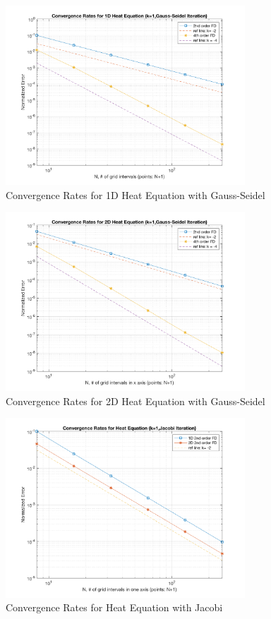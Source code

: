 \documentclass[a4paper]{article}
\begin{document}
\begin{figure}[htbp]
\centering
\includegraphics[width=0.8\textwidth]{gauss_1d.png}
\caption{\label{gauss_1d}Convergence Rates for 1D Heat Equation with Gauss-Seidel}
\end{figure}

\begin{figure}[htbp]
\centering
\includegraphics[width=0.8\textwidth]{gauss_2d.png}
\caption{\label{gauss_2d}Convergence Rates for 2D Heat Equation with Gauss-Seidel}
\end{figure}

\begin{figure}[htbp]
\centering
\includegraphics[width=0.8\textwidth]{jacobi.png}
\caption{\label{jacobi}Convergence Rates for Heat Equation with Jacobi}
\end{figure}
\end{document}
